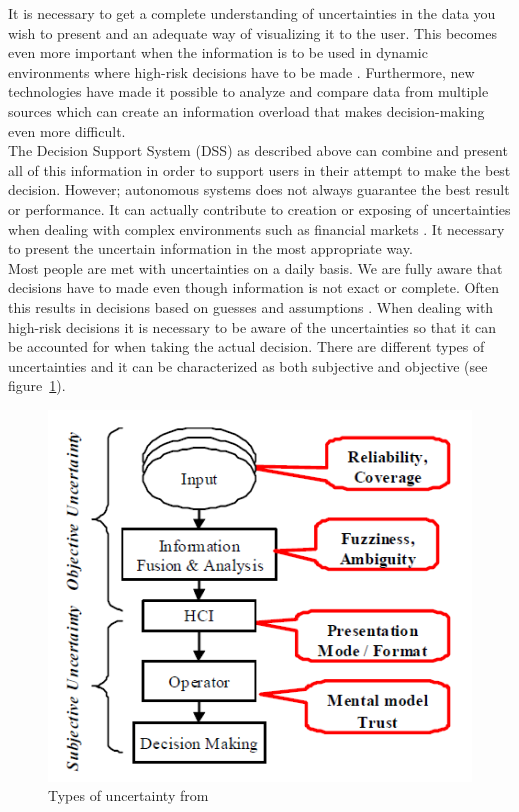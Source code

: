 It is necessary to get a complete understanding of uncertainties in the data you wish to present and an adequate way of visualizing it to the user. This becomes even more important when the information is to be used in dynamic environments where high-risk decisions have to be made \cite{UncertainInformation}. Furthermore, new technologies have made it possible to analyze and compare data from multiple sources which can create an information overload that makes decision-making even more difficult.
\\[0.5cm]
The Decision Support System (DSS) as described above can combine and present all of this information in order to support users in their attempt to make the best decision. However; autonomous systems does not always guarantee the best result or performance. It can actually contribute to creation or exposing of uncertainties when dealing with complex environments such as financial markets \cite{UncertainInformation}. It necessary to present the uncertain information in the most appropriate way.
\\[0.5cm]
Most people are met with uncertainties on a daily basis. We are fully aware that decisions have to made even though information is not exact or complete. Often this results in decisions based on guesses and assumptions \cite{UncertainInformation}. When dealing with high-risk decisions it is necessary to be aware of the uncertainties so that it can be accounted for when taking the actual decision. 
There are different types of uncertainties and it can be characterized as both subjective and objective (see figure~\ref{fig:typesOfUncertainty}). 
\begin{figure}[h!]
\centering
\includegraphics[width=0.7\linewidth,natwidth=898,natheight=587]{billeder/TypesOfUncertainInformation.png}
\caption{Types of uncertainty from \cite{UncertainInformation}}
\label{fig:typesOfUncertainty}
\end{figure}  
